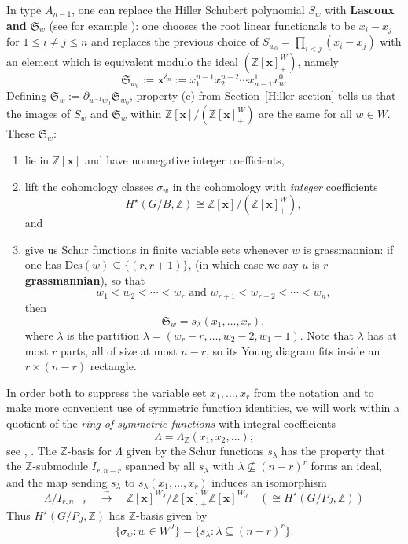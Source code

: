 \documentclass[12pt,dvips]{amsart}
\theoremstyle{plain}
\theoremstyle{definition}
\theoremstyle{remark}
\numberwithin{equation}{section}
\def\ZZ{{\mathbb Z}}
\def\schubp{\mathfrak{S}}
\def\Des{\mathrm{Des}}
\def\xx{\mathbf{x}}
\begin{document}
 In type $A_{n-1}$, one can replace the Hiller Schubert polynomial $S_w$ 
with {\bf Lascoux and}  $\schubp_w$ 
(see for example \cite{Macdonald, Manivel}):
one chooses the root linear functionals to be 
$x_i-x_j$ for $1 \leq i \neq j \leq n$ and
replaces the previous choice of $S_{w_0}= \prod_{i<j}(x_i-x_j)$ 
with an element which is equivalent modulo the ideal $(\ZZ[\xx]^W_+)$, namely
$$
\schubp_{w_0} :=  \xx^{\delta_n}:=x_1^{n-1} x_2^{n-2} 
\cdots x_{n-1}^1 x_n^0.
$$
Defining $\schubp_w := \partial_{w^{-1}w_0} \schubp_{w_0}$, property (c)
from Section~\ref{Hiller-section} tells us that the images of $S_w$
and $\schubp_w$ within $\ZZ[\xx]/(\ZZ[\xx]^W_+)$ are the same for all
$w\in W$. These $\schubp_w$:
\begin{enumerate}
\item[$\bullet$] lie in $\ZZ[\xx]$ and have nonnegative integer coefficients,
\item[$\bullet$] lift the cohomology classes $\sigma_w$ in the 
cohomology with {\it integer} coefficients 
\[H^\star(G/B,\ZZ) \cong \ZZ[\xx]/(\ZZ[\xx]^W_+),\] 
and
\item[$\bullet$] give us Schur functions in finite variable sets
whenever $w$ is grassmannian: if one has $\Des(w) \subseteq
\{(r,r+1)\}$, (in which case we say $u$ is $r$-{\bf grassmannian}), so that
$$
w_1 < w_2 < \cdots < w_r \text{ and }
w_{r+1} < w_{r+2} < \cdots < w_n,
$$
then
$$
\schubp_w = s_\lambda(x_1,\ldots,x_r),
$$
where $\lambda$ is the partition $\lambda=(w_r-r,\ldots,w_2-2,w_1-1)$.
Note that $\lambda$ has at most $r$ parts, all of size at most $n-r$,
so its Young diagram fits inside an $r \times (n-r)$ rectangle.
\end{enumerate}

In order both to suppress the variable set $x_1,\ldots,x_r$ from the
notation and to make more convenient use of symmetric function
identities, we will work within a quotient of the {\it ring of
  symmetric functions} with integral coefficients
$$
\Lambda=\Lambda_\ZZ(x_1,x_2,\ldots);
$$
see \cite[Chapter 1]{Macdonald-symm-fns}, \cite[Chapter 7]{Stanley-EC2}.
The $\ZZ$-basis for $\Lambda$ given by the Schur functions $s_\lambda$ 
has the property that the $\ZZ$-submodule $I_{r,n-r}$ spanned by all $s_\lambda$
with  $\lambda \not\subseteq (n-r)^r$ forms an ideal, and the
map sending $s_\lambda$ to $s_\lambda(x_1,\ldots,x_r)$ induces an isomorphism
$$
\Lambda/I_{r,n-r} \quad \overset{\sim}{\longrightarrow} \quad \ZZ[\xx]^{W_J}/\ZZ[\xx]^W_+ \ZZ[\xx]^{W_J} 
                     \quad \left( \cong H^\star(G/P_J,\ZZ) \right) 
$$
Thus $H^\star(G/P_J,\ZZ)$ has $\ZZ$-basis given by 
$$
\{ \sigma_w: w \in W^J \}
  = \{s_\lambda: \lambda \subseteq (n-r)^r \}.
$$
\end{document}
